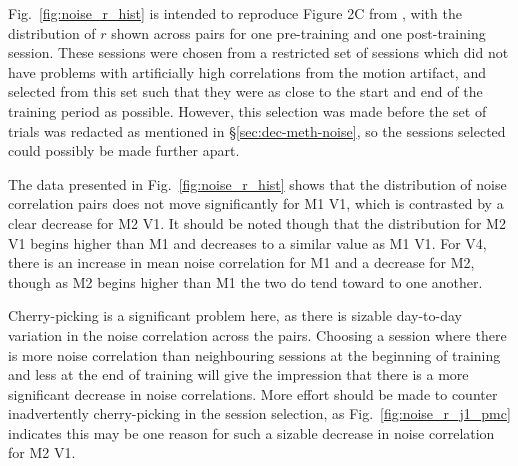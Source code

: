 Fig.~\ref{fig:noise_r_hist} is intended to reproduce Figure 2C from \citet{Gu2011}, with the distribution of $r$ shown across pairs for one pre-training and one post-training session.
These sessions were chosen from a restricted set of sessions which did not have problems with artificially high correlations from the motion artifact, and selected from this set such that they were as close to the start and end of the training period as possible.
However, this selection was made before the set of trials was redacted as mentioned in \S\ref{sec:dec-meth-noise}, so the sessions selected could possibly be made further apart.

The data presented in Fig.~\ref{fig:noise_r_hist} shows that the distribution of noise correlation pairs does not move significantly for \ac{M1} \ac{V1}, which is contrasted by a clear decrease for \ac{M2} \ac{V1}.
It should be noted though that the distribution for \ac{M2} \ac{V1} begins higher than \ac{M1} and decreases to a similar value as \ac{M1} \ac{V1}.
For \ac{V4}, there is an increase in mean noise correlation for \ac{M1} and a decrease for \ac{M2}, though as \ac{M2} begins higher than \ac{M1} the two do tend toward to one another.

Cherry-picking is a significant problem here, as there is sizable day-to-day variation in the noise correlation across the pairs.
Choosing a session where there is more noise correlation than neighbouring sessions at the beginning of training and less at the end of training will give the impression that there is a more significant decrease in noise correlations.
More effort should be made to counter inadvertently cherry-picking in the session selection, as Fig.~\ref{fig:noise_r_j1_pmc} indicates this may be one reason for such a sizable decrease in noise correlation for \ac{M2} \ac{V1}.

